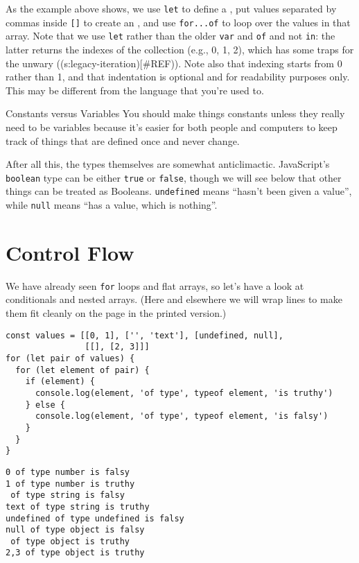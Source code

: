 As the example above shows,
we use \texttt{let} to define a ,
put values separated by commas inside \texttt{{[}{]}} to create an ,
and use \texttt{for...of} to loop over the values in that array.
Note that we use \texttt{let} rather than the older \texttt{var} and \texttt{of} and not \texttt{in}:
the latter returns the indexes of the collection (e.g., 0, 1, 2),
which has some traps for the unwary ((s:legacy-iteration){[}\#REF)).
Note also that indexing starts from 0 rather than 1,
and that indentation is optional and for readability purposes only.
This may be different from the language that you're used to.

\begin{aside}{Constants versus Variables}
  You should make things constants unless they really need to be variables
  because it's easier for both people and computers to keep track of things
  that are defined once and never change.
\end{aside}

After all this,
the types themselves are somewhat anticlimactic.
JavaScript's \texttt{boolean} type can be either \texttt{true} or \texttt{false},
though we will see below that other things can be treated as Booleans.
\texttt{undefined} means ``hasn't been given a value'',
while \texttt{null} means ``has a value, which is nothing''.

\section{Control Flow}\label{s:basics-control-flow}

We have already seen \texttt{for} loops and flat arrays,
so let's have a look at conditionals and nested arrays.
(Here and elsewhere we will wrap lines to make them fit cleanly on the page
in the printed version.)

\begin{verbatim}
const values = [[0, 1], ['', 'text'], [undefined, null],
                [[], [2, 3]]]
for (let pair of values) {
  for (let element of pair) {
    if (element) {
      console.log(element, 'of type', typeof element, 'is truthy')
    } else {
      console.log(element, 'of type', typeof element, 'is falsy')
    }
  }
}
\end{verbatim}

\begin{verbatim}
0 of type number is falsy
1 of type number is truthy
 of type string is falsy
text of type string is truthy
undefined of type undefined is falsy
null of type object is falsy
 of type object is truthy
2,3 of type object is truthy
\end{verbatim}

